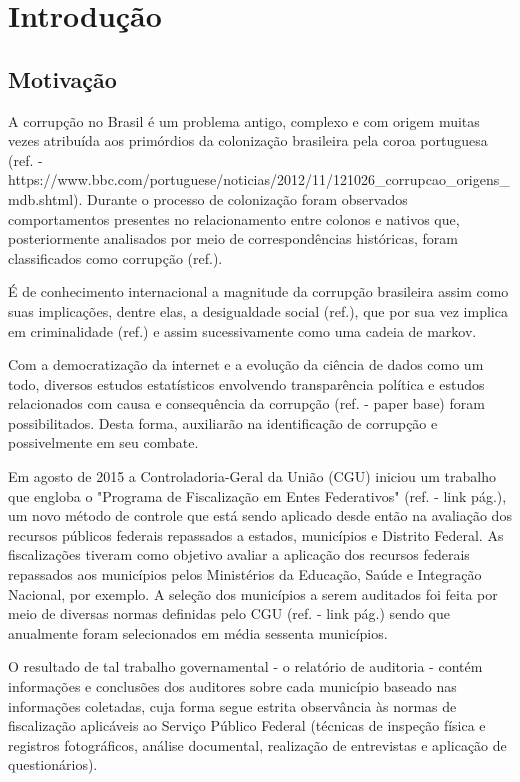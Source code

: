 \chapter{Introdução}
\label{cap:introducao}
\section{Motivação}
\label{sec:motivacao}

A corrupção no Brasil é um problema antigo, complexo e com origem muitas vezes atribuída aos primórdios da colonização brasileira pela coroa portuguesa (ref. - https://www.bbc.com/portuguese/noticias/2012/11/121026_corrupcao_origens_mdb.shtml). Durante o processo de colonização foram observados comportamentos presentes no relacionamento entre colonos e nativos que, posteriormente analisados por meio de correspondências históricas, foram classificados como corrupção (ref.).

É de conhecimento internacional a magnitude da corrupção brasileira assim como suas implicações, dentre elas, a desigualdade social (ref.), que por sua vez implica em criminalidade (ref.) e assim sucessivamente como uma cadeia de markov.

Com a democratização da internet e a evolução da ciência de dados como um todo, diversos estudos estatísticos envolvendo transparência política e estudos relacionados com causa e consequência da corrupção (ref. - paper base) foram possibilitados. Desta forma, auxiliarão na identificação de corrupção e possivelmente em seu combate.

Em agosto de 2015 a Controladoria-Geral da União (CGU) iniciou um trabalho que engloba o "Programa de Fiscalização em Entes Federativos" (ref. - link pág.), um novo método de controle que está sendo aplicado desde então na avaliação dos recursos públicos federais repassados a estados, municípios e Distrito Federal. As fiscalizações tiveram como objetivo avaliar a aplicação dos recursos federais repassados aos municípios pelos Ministérios da Educação, Saúde e Integração Nacional, por exemplo. A seleção dos municípios a serem auditados foi feita por meio de diversas normas definidas pelo CGU (ref. - link pág.) sendo que anualmente foram selecionados em média sessenta municípios.

O resultado de tal trabalho governamental - o relatório de auditoria - contém informações e conclusões dos auditores sobre cada município baseado nas informações coletadas, cuja forma segue estrita observância às normas de fiscalização aplicáveis ao Serviço Público Federal (técnicas de inspeção física e registros fotográficos, análise documental, realização de entrevistas e aplicação de questionários).

